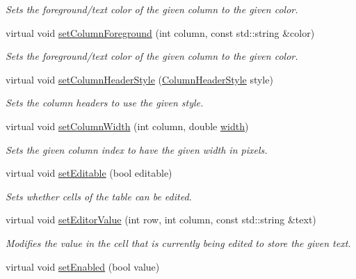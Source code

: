 \begin{DoxyCompactItemize}
\begin{DoxyCompactList}\small\item\em Sets the foreground/text color of the given column to the given color. \end{DoxyCompactList}\item 
virtual void \mbox{\hyperlink{classGTable_a84ca08c2995646ab28c78bffbcdc2693}{set\+Column\+Foreground}} (int column, const std\+::string \&color)
\begin{DoxyCompactList}\small\item\em Sets the foreground/text color of the given column to the given color. \end{DoxyCompactList}\item 
virtual void \mbox{\hyperlink{classGTable_ac97cb91256925fa81c52594bca854969}{set\+Column\+Header\+Style}} (\mbox{\hyperlink{classGTable_a060cff504451bbb98530e64e936e2671}{Column\+Header\+Style}} style)
\begin{DoxyCompactList}\small\item\em Sets the column headers to use the given style. \end{DoxyCompactList}\item 
virtual void \mbox{\hyperlink{classGTable_a52075dc231c73a896bcef426047fd327}{set\+Column\+Width}} (int column, double \mbox{\hyperlink{classGTable_ad72663daf610f2a0833a2fc3d78e4fdf}{width}})
\begin{DoxyCompactList}\small\item\em Sets the given column index to have the given width in pixels. \end{DoxyCompactList}\item 
virtual void \mbox{\hyperlink{classGTable_a52455aaff9ee352ca405fa61ba246b84}{set\+Editable}} (bool editable)
\begin{DoxyCompactList}\small\item\em Sets whether cells of the table can be edited. \end{DoxyCompactList}\item 
virtual void \mbox{\hyperlink{classGTable_aaefc85e4ff762ca176a90ebac163f2c0}{set\+Editor\+Value}} (int row, int column, const std\+::string \&text)
\begin{DoxyCompactList}\small\item\em Modifies the value in the cell that is currently being edited to store the given text. \end{DoxyCompactList}\item 
virtual void \mbox{\hyperlink{classGInteractor_ab831367dd84bbd579e02e55bacb21343}{set\+Enabled}} (bool value)

\end{DoxyCompactItemize}
